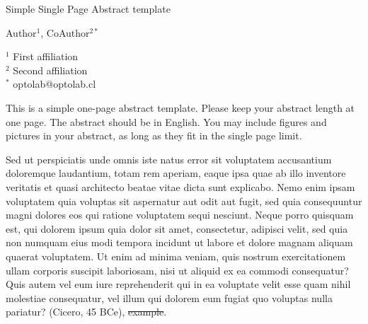 \documentclass{article}
\begin{document}

\Large
 \begin{center}
Simple Single Page Abstract template\\ 

\hspace{10pt}

\large
Author$^1$, CoAuthor$^{2*}$ \\

\hspace{10pt}

\small  
$^1$ First affiliation\\
$^2$ Second affiliation\\
$^*$ optolab@optolab.cl

\end{center}

\hspace{10pt}

\normalsize

This is a simple one-page abstract template. Please keep your abstract length at one page. The abstract should be in English. You may include figures and pictures in your abstract, as long as they fit in the single page limit.

Sed ut perspiciatis unde omnis iste natus error sit voluptatem accusantium doloremque laudantium, totam rem aperiam, eaque ipsa quae ab illo inventore veritatis et quasi architecto beatae vitae dicta sunt explicabo. Nemo enim ipsam voluptatem quia voluptas sit aspernatur aut odit aut fugit, sed quia consequuntur magni dolores eos qui ratione voluptatem sequi nesciunt. Neque porro quisquam est, qui dolorem ipsum quia dolor sit amet, consectetur, adipisci velit, sed quia non numquam eius modi tempora incidunt ut labore et dolore magnam aliquam quaerat voluptatem. Ut enim ad minima veniam, quis nostrum exercitationem ullam corporis suscipit laboriosam, nisi ut aliquid ex ea commodi consequatur? Quis autem vel eum iure reprehenderit qui in ea voluptate velit esse quam nihil molestiae consequatur, vel illum qui dolorem eum fugiat quo voluptas nulla pariatur? (Cicero, 45 BCe), \sout{example}.


 

\nocite{*}
\end{document}
